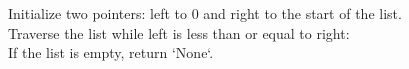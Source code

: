 \documentclass[preview]{standalone}
\begin{document}
Initialize two pointers: left to 0 and right to the start of the list.\\Traverse the list while left is less than or equal to right:\\If the list is empty, return `None`.\\
\end{document}
